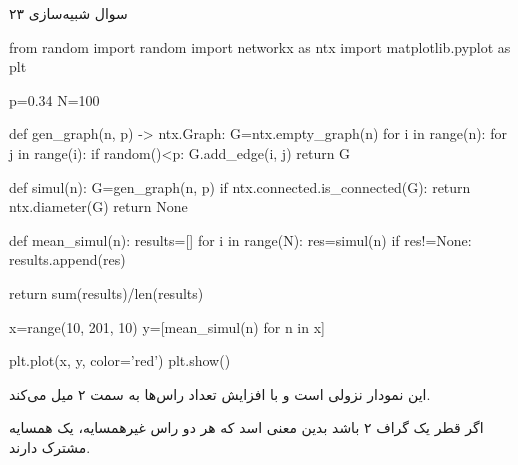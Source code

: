 سوال شبیه‌سازی ۲۳

\begin{latin}
\begin{python}
from random import random
import networkx as ntx
import matplotlib.pyplot as plt

p=0.34
N=100

def gen_graph(n, p) -> ntx.Graph:
	G=ntx.empty_graph(n)
	for i in range(n):
		for j in range(i):
			if random()<p:
				G.add_edge(i, j)
	return G

def simul(n):
	G=gen_graph(n, p)
	if ntx.connected.is_connected(G):
		return ntx.diameter(G)
	return None

def mean_simul(n):
	results=[]
	for i in range(N):
		res=simul(n)
		if res!=None:
			results.append(res)
	
	return sum(results)/len(results)


x=range(10, 201, 10)
y=[mean_simul(n) for n in x]

plt.plot(x, y, color='red')
plt.show()
\end{python}
\end{latin}

این نمودار نزولی است و با افزایش تعداد راس‌ها به سمت ۲ میل می‌کند.

اگر قطر یک گراف ۲ باشد بدین معنی اسد که هر دو راس غیرهمسایه، یک همسایه مشترک دارند.